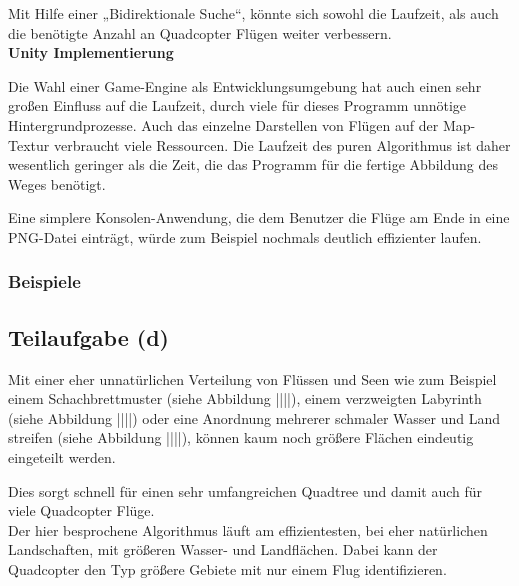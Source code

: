\documentclass[a4paper,12pt]{article}
\begin{document}
Mit Hilfe einer „Bidirektionale Suche“, könnte sich sowohl die Laufzeit, als auch die benötigte Anzahl an Quadcopter Flügen weiter verbessern.
\\[0.4cm]
\textbf{Unity Implementierung}

Die Wahl einer Game-Engine als Entwicklungsumgebung hat auch einen sehr großen Einfluss auf die Laufzeit, durch viele für dieses Programm unnötige Hintergrundprozesse. Auch das einzelne Darstellen von Flügen auf der Map-Textur verbraucht viele Ressourcen. Die Laufzeit des puren Algorithmus ist daher wesentlich geringer als die Zeit, die das Programm für die fertige Abbildung des Weges benötigt.

Eine simplere Konsolen-Anwendung, die dem Benutzer die Flüge am Ende in eine PNG-Datei einträgt, würde zum Beispiel nochmals deutlich effizienter laufen.


\subsubsection{Beispiele}

\subsection{Teilaufgabe (d)}
Mit einer eher unnatürlichen Verteilung von Flüssen und Seen wie zum Beispiel einem Schachbrettmuster (siehe Abbildung ||||), einem verzweigten Labyrinth (siehe Abbildung ||||) oder eine Anordnung mehrerer schmaler Wasser und Land streifen (siehe Abbildung ||||), können kaum noch größere Flächen eindeutig eingeteilt werden.

Dies sorgt schnell für einen sehr umfangreichen Quadtree und damit auch für viele Quadcopter Flüge.
\\[0.4cm]
Der hier besprochene Algorithmus läuft am effizientesten, bei eher natürlichen Landschaften, mit größeren Wasser- und Landflächen. Dabei kann der Quadcopter den Typ größere Gebiete mit nur einem Flug identifizieren.
\end{document}
